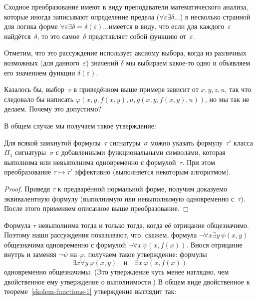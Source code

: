 Сходное преобразование имеют в виду преподаватели
математического анализа, которые иногда записывают определение
предела ($\forall \varepsilon \exists\delta\ldots$) в несколько
странной для логика форме $\forall \varepsilon \exists
\delta=\delta(\varepsilon)\ldots$\т имеется в виду, что если для
каждого~$\varepsilon$ найдётся~$\delta$, то это самое~$\delta$
представляет собой функцию от~$\varepsilon$.

Отметим, что это рассуждение использует аксиому выбора, когда из
различных возможных (для данного~$\varepsilon$) значений
$\delta$ мы выбираем какое-то одно и объявляем его значением
функции $\delta(\varepsilon)$.

\begin{problem}
Казалось бы, выбор~$v$ в приведённом выше примере зависит от
$x,y,z,u$, так что следовало бы написать
$\varphi(x,y,f(x,y),u,g(x,y,f(x,y),u))$, но мы так не делаем.
Почему это допустимо?
\end{problem}

В общем случае мы получаем такое утверждение:

\begin{theorem}
        \label{skolem-functions-1}
Для всякой замкнутой формулы~$\tau$ сигнатуры~$\sigma$ можно
указать формулу~$\tau'$ класса $\Pi_1$ сигнатуры~$\sigma$ с
добавленными функциональными символами, которая выполнима или
невыполнима одновременно с формулой~$\tau$. При этом
преобразование $\tau\mapsto\tau'$ эффективно (выполняется
некоторым алгоритмом).
\end{theorem}

\begin{proof}
Приведя $\tau$ к предварённой нормальной форме, получим
доказуемо эквивалентную формулу (выполнимую или невыполнимую
одновременно с~$\tau$). После этого применяем
описанное выше преобразование.
\end{proof}

Формула $\tau$ невыполнима тогда и только тогда, когда её
отрицание общезначимо. Поэтому наши рассуждения показывают, что,
скажем, формула $\lnot \forall x \exists y\,\psi(x,y)$
общезначима одновременно с формулой $\lnot \forall x
\,\psi(x,f(x))$. Внося отрицание внутрь и заменяя $\lnot\psi$ на
$\varphi$, получаем такое утверждение: формулы
        $$
\exists x \forall y\,\varphi(x,y)
        \quad \text{и}\quad
\exists x \,\varphi(x,f(x))
        $$
одновременно общезначимы. (Это утверждение чуть менее наглядно,
чем двойственное ему утверждение о выполнимости.) В общем
виде двойственное к теореме~\ref{skolem-functions-1}
утверждение выглядит так:

